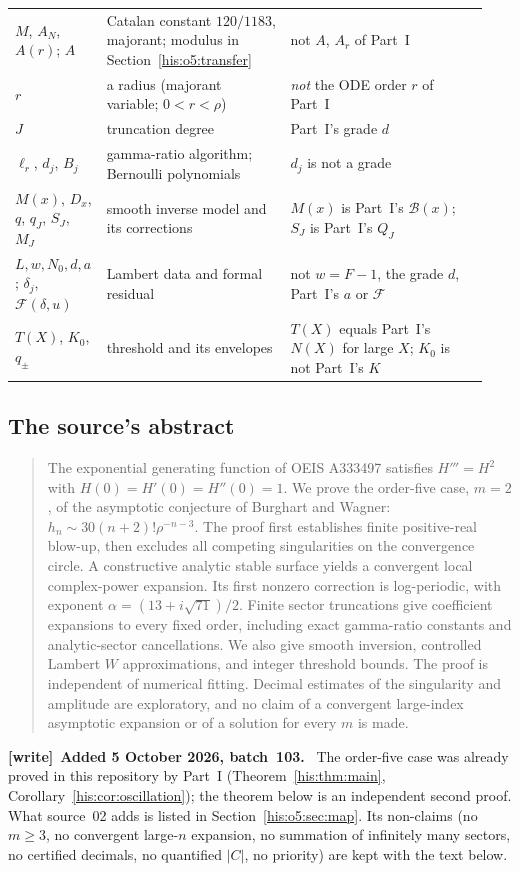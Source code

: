 \documentclass[11pt]{article}
\theoremstyle{remark}\newtheorem{remark}[theorem]{Remark}
\numberwithin{equation}{section}
\newenvironment{writenote}[1][]{\par\smallskip\begingroup\small
 \noindent\textbf{[write]}\if\relax\detokenize{#1}\relax\else~\textbf{#1.}\fi\ }%
 {\par\endgroup\smallskip}
\begin{document}
\begin{center}
\begin{tabular}{@{}>{\raggedright\arraybackslash}p{0.15\linewidth}>{\raggedright\arraybackslash}p{0.38\linewidth}>{\raggedright\arraybackslash}p{0.41\linewidth}@{}}
$M$, $A_N$, $A(r)$; $A$ & Catalan constant $120/1183$, majorant; modulus in Section~\ref{his:o5:transfer} & not $A$, $A_r$ of Part~I\\
$r$ & a radius (majorant variable; $0<r<\rho$) & \emph{not} the ODE order $r$ of Part~I\\
$J$ & truncation degree & Part~I's grade $d$\\
$\ell_r$, $d_j$, $B_j$ & gamma-ratio algorithm; Bernoulli polynomials & $d_j$ is not a grade\\
$M(x)$, $D_x$, $q$, $q_J$, $S_J$, $M_J$ & smooth inverse model and its corrections & $M(x)$ is Part~I's $\mathcal B(x)$; $S_J$ is Part~I's $Q_J$\\
$L,w,N_0,d,a$; $\delta_j$, $\mathcal F(\delta,u)$ & Lambert data and formal residual & not $w=F-1$, the grade $d$, Part~I's $a$ or $\mathcal F$\\
$T(X)$, $K_0$, $q_\pm$ & threshold and its envelopes & $T(X)$ equals Part~I's $N(X)$ for large $X$; $K_0$ is not Part~I's $K$\\
\bottomrule
\end{tabular}
\end{center}

\subsection{The source's abstract}\label{his:o5:sec:abstract}
\begin{quote}\small
The exponential generating function of OEIS A333497 satisfies
$H'''=H^2$ with $H(0)=H'(0)=H''(0)=1$.
We prove the order-five case, $m=2$, of the asymptotic conjecture of
Burghart and Wagner: $h_n\sim30(n+2)!\rho^{-n-3}$.
The proof first establishes finite positive-real blow-up, then excludes all
competing singularities on the convergence circle. A constructive analytic
stable surface yields a convergent local complex-power expansion. Its first
nonzero correction is log-periodic, with exponent
$\alpha=(13+i\sqrt{71})/2$. Finite sector truncations give coefficient
expansions to every fixed order, including exact gamma-ratio constants and
analytic-sector cancellations. We also give smooth inversion, controlled
Lambert $W$ approximations, and integer threshold bounds.
The proof is independent of numerical fitting. Decimal estimates of the
singularity and amplitude are exploratory, and no claim of a convergent
large-index asymptotic expansion or of a solution for every $m$ is made.
\end{quote}
\begin{writenote}[Added 5 October 2026, batch~103]
The order-five case was already proved in this repository by Part~I (Theorem~\ref{his:thm:main}, Corollary~\ref{his:cor:oscillation}); the theorem below is an independent second proof. What source~02 adds is listed in Section~\ref{his:o5:sec:map}. Its non-claims (no $m\ge3$, no convergent large-$n$ expansion, no summation of infinitely many sectors, no certified decimals, no quantified $|C|$, no priority) are kept with the text below.
\end{writenote}
\end{document}
